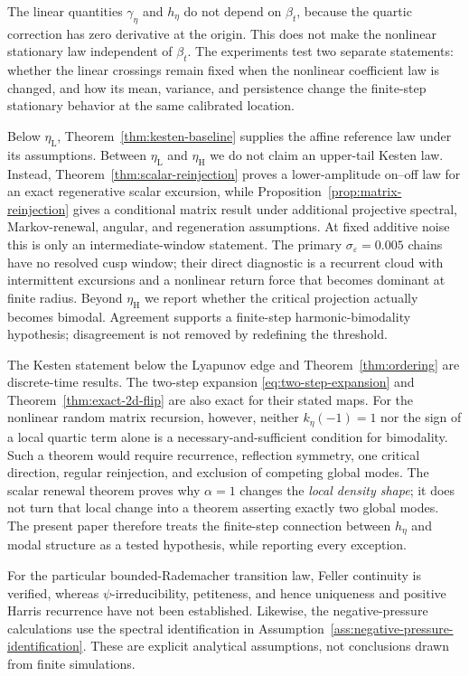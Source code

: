 \documentclass[11pt]{article}
\theoremstyle{definition}
\begin{document}
The linear quantities $\gamma_\eta$ and $h_\eta$ do not depend on
$\beta_t$, because the quartic correction has zero derivative at the origin.
This does not make the nonlinear stationary law independent of $\beta_t$.
The experiments test two separate statements: whether the linear crossings
remain fixed when the nonlinear coefficient law is changed, and how its mean,
variance, and persistence change the finite-step stationary behavior at the
same calibrated location.

Below $\eta_{\mathrm L}$, Theorem~\ref{thm:kesten-baseline} supplies the
affine reference law under its assumptions.  Between $\eta_{\mathrm L}$ and
$\eta_{\mathrm H}$ we do not claim an upper-tail Kesten law.  Instead,
Theorem~\ref{thm:scalar-reinjection} proves a lower-amplitude on--off law for
an exact regenerative scalar excursion, while
Proposition~\ref{prop:matrix-reinjection} gives a conditional matrix result
under additional projective spectral, Markov-renewal, angular, and
regeneration assumptions.  At fixed
additive noise this is only an intermediate-window statement.  The primary
$\sigma_\varepsilon=0.005$ chains have no resolved cusp window; their direct
diagnostic is a recurrent cloud with intermittent excursions and a nonlinear
return force that becomes dominant at finite radius.  Beyond
$\eta_{\mathrm H}$ we report whether the critical projection actually becomes
bimodal.  Agreement supports a finite-step harmonic-bimodality hypothesis;
disagreement is not removed by redefining the threshold.

The Kesten statement below the Lyapunov edge and
Theorem~\ref{thm:ordering} are discrete-time results.  The two-step expansion
\eqref{eq:two-step-expansion} and Theorem~\ref{thm:exact-2d-flip} are also
exact for their stated maps.  For the nonlinear random matrix recursion,
however, neither $k_\eta(-1)=1$ nor the sign of a local quartic term alone is
a necessary-and-sufficient condition for bimodality.  Such a theorem would
require recurrence, reflection symmetry, one critical direction, regular
reinjection, and exclusion of competing global modes.  The scalar renewal
theorem proves why $\alpha=1$ changes the \emph{local density shape}; it does
not turn that local change into a theorem asserting exactly two global modes.
The present paper therefore treats the finite-step connection between
$h_\eta$ and modal structure as a tested hypothesis, while reporting every
exception.

For the particular bounded-Rademacher transition law, Feller continuity is
verified, whereas $\psi$-irreducibility, petiteness, and hence uniqueness and
positive Harris recurrence have not been established.  Likewise, the
negative-pressure calculations use the spectral identification in
Assumption~\ref{ass:negative-pressure-identification}.  These are explicit
analytical assumptions, not conclusions drawn from finite simulations.
\end{document}
